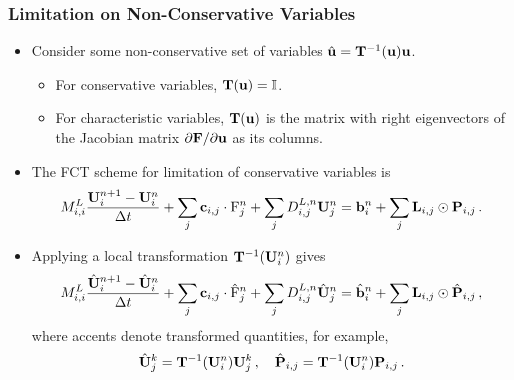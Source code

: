 \documentclass{beamer} \useoutertheme{infolines}
\begin{document}
\begin{frame}
\frametitle{Limitation on Non-Conservative Variables}

\begin{itemize}
  \item Consider some non-conservative set of variables
    $\hat{\mathbf{u}} = \mathbf{T}^{-1}(\mathbf{u})\mathbf{u}$.
    \begin{itemize}
      \item For \textcolor{secondarycolorheavy}{conservative} variables,
        $\mathbf{T}(\mathbf{u})=\mathbb{I}$.
      \item For \textcolor{secondarycolorheavy}{characteristic} variables,
        $\mathbf{T}(\mathbf{u})$ is the matrix with right eigenvectors
        of the Jacobian matrix $\partial\consfluxvector/\partial\vectorsolution$
        as its columns.
    \end{itemize}
  \item The FCT scheme for limitation of conservative variables is
    \begin{equation}
      \lumpedmassentry
        \frac{\solutionvector_i^{n+1}-\solutionvector_i^n}{\dt}
        + \sum_j\gradiententry\cdot\consfluxinterpolant_j^n
        + \sum_j\diffusionmatrixletter\ij^{L,n}\solutionvector_j^n
        = \ssrhs_i^n + \sum_j\limitermatrix\ij\odot\correctionfluxmatrix\ij \eqp
    \end{equation}
  \item Applying a local transformation $\mathbf{T}^{-1}(\mathbf{U}_i^n)$ gives
    \begin{equation}
      \lumpedmassentry
        \frac{\hat{\solutionvector}_i^{n+1}-\hat{\solutionvector}_i^n}{\dt}
        + \sum_j\gradiententry\cdot\hat{\consfluxinterpolant}_j^n
        + \sum_j\diffusionmatrixletter\ij^{L,n}\hat{\solutionvector}_j^n
        = \hat{\ssrhs}_i^n + \sum_j\limitermatrix\ij\odot\hat{\correctionfluxmatrix}\ij
        \eqc
    \end{equation}
    where accents denote transformed quantities, for example,
    \begin{equation}
      \hat{\solutionvector}_j^k
        = \mathbf{T}^{-1}(\solutionvector_i^n)\solutionvector_j^k
      \eqc \quad
      \hat{\correctionfluxmatrix}\ij
        = \mathbf{T}^{-1}(\solutionvector_i^n)\correctionfluxmatrix\ij
      \eqp
    \end{equation}
\end{itemize}

\end{frame}
\end{document}
